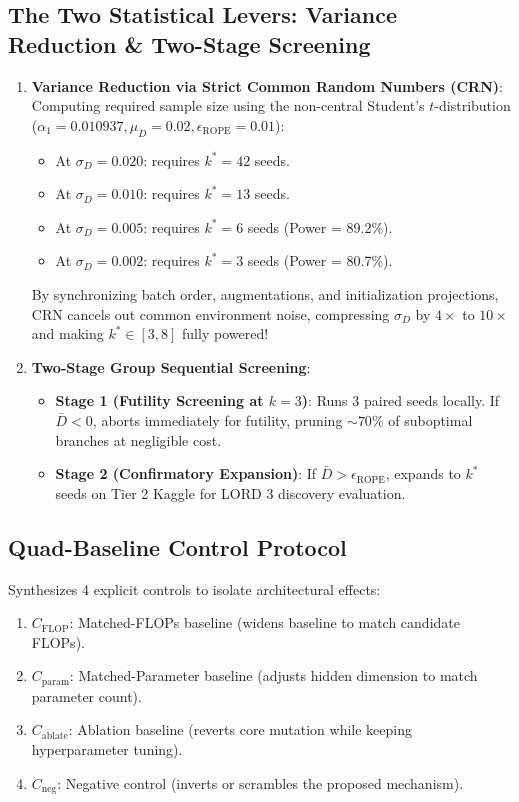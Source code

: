 \documentclass[11pt,a4paper]{article}
\begin{document}
\subsection{The Two Statistical Levers: Variance Reduction \& Two-Stage Screening}
\begin{enumerate}
    \item \textbf{Variance Reduction via Strict Common Random Numbers (CRN)}: Computing required sample size using the non-central Student's $t$-distribution ($\alpha_1 = 0.010937, \mu_D = 0.02, \epsilon_{\text{ROPE}} = 0.01$):
    \begin{itemize}[noitemsep]
        \item At $\sigma_D = 0.020$: requires $k^* = 42$ seeds.
        \item At $\sigma_D = 0.010$: requires $k^* = 13$ seeds.
        \item At $\sigma_D = 0.005$: requires $k^* = 6$ seeds (Power = 89.2\%).
        \item At $\sigma_D = 0.002$: requires $k^* = 3$ seeds (Power = 80.7\%).
    \end{itemize}
    By synchronizing batch order, augmentations, and initialization projections, CRN cancels out common environment noise, compressing $\sigma_D$ by $4\times$ to $10\times$ and making $k^* \in [3, 8]$ fully powered!
    \item \textbf{Two-Stage Group Sequential Screening}:
    \begin{itemize}[noitemsep]
        \item \textbf{Stage 1 (Futility Screening at $k=3$)}: Runs 3 paired seeds locally. If $\bar{D} < 0$, aborts immediately for futility, pruning $\sim 70\%$ of suboptimal branches at negligible cost.
        \item \textbf{Stage 2 (Confirmatory Expansion)}: If $\bar{D} > \epsilon_{\text{ROPE}}$, expands to $k^*$ seeds on Tier 2 Kaggle for LORD 3 discovery evaluation.
    \end{itemize}
\end{enumerate}

\subsection{Quad-Baseline Control Protocol}
Synthesizes 4 explicit controls to isolate architectural effects:
\begin{enumerate}[noitemsep]
    \item $C_{\text{FLOP}}$: Matched-FLOPs baseline (widens baseline to match candidate FLOPs).
    \item $C_{\text{param}}$: Matched-Parameter baseline (adjusts hidden dimension to match parameter count).
    \item $C_{\text{ablate}}$: Ablation baseline (reverts core mutation while keeping hyperparameter tuning).
    \item $C_{\text{neg}}$: Negative control (inverts or scrambles the proposed mechanism).
\end{enumerate}
\end{document}
